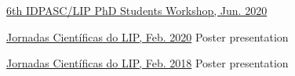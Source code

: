 \begin{cventries}
    {}{\href{https://indico.lip.pt/event/699/}{6th IDPASC/LIP PhD Students Workshop, Jun. 2020}}
    {}

    {}{\href{https://indico.lip.pt/event/650/}{Jornadas Científicas do LIP, Feb. 2020}}
    {Poster presentation}

    {}{\href{https://indico.lip.pt/event/359/}{Jornadas Científicas do LIP, Feb. 2018}}
    {Poster presentation}    

\end{cventries}